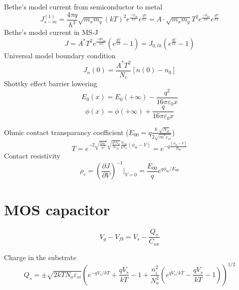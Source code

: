 Bethe's model current from semiconductor to metal
\begin{equation}
J_{s-m}^{(1)}=\frac{4\pi q}{h^3}\sqrt{m_xm_y}(kT)^2e^{\frac{-\phi_{bn}}{kT}}e^{\frac{qV}{kT}}=A\cdot\sqrt{m_xm_y}T^2e^{\frac{-\phi_{bn}}{kT}}e^{\frac{qV}{kT}}
\end{equation}
Bethe's model current in MS-J
\begin{equation}
J=A^*T^2e^{\frac{-q\phi_{bn}}{kT}}(e^{\frac{qV}{kT}}-1)=J_{0,th}(e^{\frac{qV}{kT}}-1)
\end{equation}
\vspace{3mm}
Universal model boundary condition
\begin{equation}
J_n(0)=\frac{A^*T^2 }{N_c}[n(0)-n_0]
\end{equation}
\vspace{3mm}
Shottky effect barrier lowering 
\begin{equation}
E_0(x)=E_0(+\infty)-\frac{q^2}{16 \pi \varepsilon_0 x}
\end{equation}
\begin{equation}
\phi(x)=\phi(+\infty)+\frac{q}{16\pi \varepsilon_0 x}
\end{equation}
\vspace{3mm}

Ohmic contact transparancy coefficient ($E_{00}=q\frac{\hslash \sqrt{N_d}}{2\sqrt{m^*\varepsilon_{si}}}$)
\begin{equation}
T=e^{-2\sqrt{\frac{2m^*}{\hslash^2}}\sqrt{\frac{q^2N_d}{2\varepsilon_{Si}}}\frac{2\varepsilon_{Si}}{qN_d}(\phi_{bi}-V)}=e^{-q \frac{(\phi_{bi}-V)}{E_{00}}}
\end{equation}
Contact resistivity
\begin{equation}
\rho_c=(\frac{\partial J }{\partial V})^{-1}|_{V=0}=\frac{E_{00}}{q}e^{q\phi_{bi}/E_{00}}
\end{equation}


\section{MOS capacitor}

\begin{equation}
V_g-V_{fb}=V_s-\frac{Q_s}{C_{ox}}
\end{equation}

Charge in the substrate 
\begin{equation}
Q_s=\pm\sqrt{2kTN_a\varepsilon_{si}}\left(e^{-qV_s/kT}+\frac{qV_s}{kT}-1+\frac{n_i^2}{N_a^2}(e^{qV_s/kT}-\frac{qV_s}{kT}-1)\right)^{1/2}
\end{equation}
\vspace{3mm}




















